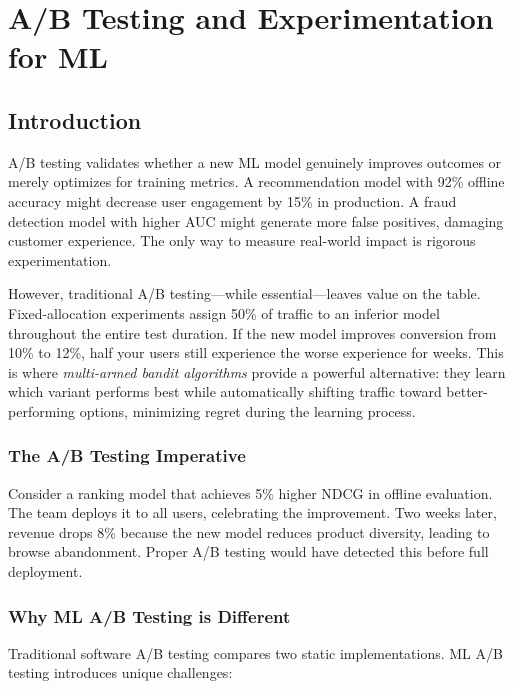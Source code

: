 \chapter{A/B Testing and Experimentation for ML}

\section{Introduction}

A/B testing validates whether a new ML model genuinely improves outcomes or merely optimizes for training metrics. A recommendation model with 92\% offline accuracy might decrease user engagement by 15\% in production. A fraud detection model with higher AUC might generate more false positives, damaging customer experience. The only way to measure real-world impact is rigorous experimentation.

However, traditional A/B testing---while essential---leaves value on the table. Fixed-allocation experiments assign 50\% of traffic to an inferior model throughout the entire test duration. If the new model improves conversion from 10\% to 12\%, half your users still experience the worse experience for weeks. This is where \textit{multi-armed bandit algorithms} provide a powerful alternative: they learn which variant performs best while automatically shifting traffic toward better-performing options, minimizing regret during the learning process.

\subsection{The A/B Testing Imperative}

Consider a ranking model that achieves 5\% higher NDCG in offline evaluation. The team deploys it to all users, celebrating the improvement. Two weeks later, revenue drops 8\% because the new model reduces product diversity, leading to browse abandonment. Proper A/B testing would have detected this before full deployment.

\subsection{Why ML A/B Testing is Different}

Traditional software A/B testing compares two static implementations. ML A/B testing introduces unique challenges:

